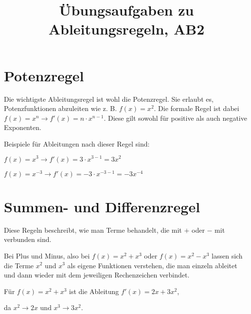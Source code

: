 \documentclass[10pt,a4paper]{article}
\begin{document}
	
\title{Übungsaufgaben zu Ableitungsregeln, AB2}

\makeatletter
\def\@maketitle{%
  \newpage
  \null
  \vskip 2em%
  \begin{center}%
  \let \footnote \thanks
    {\Huge\bfseries\@title \par}%
    \vskip 1.5em%
    {\large
      \lineskip .5em%
      \begin{tabular}[t]{c}%
        \@author
      \end{tabular}\par}%
    \vskip 1em%
    {\large \@date}%
  \end{center}%
  \par
  \vskip 1.5em}
\makeatother

\author{}
\date{}

\maketitle

\section*{Potenzregel}
Die wichtigste Ableitungsregel ist wohl die Potenzregel. Sie erlaubt es,
Potenzfunktionen abzuleiten wie z. B. $f(x) = x^2$.
Die formale Regel ist dabei $f(x) = x^n \rightarrow f'(x) = n \cdot x^{n-1}$.
Diese gilt sowohl für positive als auch negative Exponenten.

Beispiele für Ableitungen nach dieser Regel sind:

$f(x) = x^3 \rightarrow f'(x) = 3 \cdot x^{3-1} = 3x^2$

$f(x) = x^{-3} \rightarrow f'(x) = -3 \cdot x^{-3-1} = -3x^{-4}$

\section*{Summen- und Differenzregel}
Diese Regeln beschreibt, wie man Terme behandelt, die mit $+$ oder $-$ mit
verbunden sind.

Bei Plus und Minus, also bei $f(x) = x^2 + x^3$ oder $f(x) = x^2 - x^3$
lassen sich die Terme $x^2$ und $x^3$ als eigene Funktionen verstehen, die man einzeln
ableitet und dann wieder mit dem jeweiligen Rechenzeichen verbindet.

Für $f(x) = x^2 + x^3$ ist die Ableitung $f'(x) = 2x + 3x^2$, 

da $x^2 \rightarrow 2x$ und $x^3 \rightarrow 3x^2$.
\end{document}
